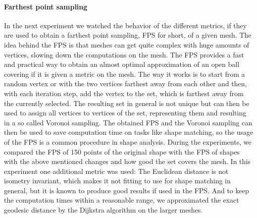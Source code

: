 \paragraph{Farthest point sampling}
In the next experiment we watched the behavior of the different metrics, if they are used to obtain a farthest point sampling, FPS for short, of a given mesh.
The idea behind the FPS is that meshes can get quite complex with huge amounts of vertices, slowing down the computations on the mesh.
The FPS provides a fast and practical way to obtain an almost optimal approximation of an open ball covering if it is given a metric on the mesh.
The way it works is to start from a random vertex or with the two vertices farthest away from each other and then, with each iteration step, add the vertex to the set, which is farthest away from the currently selected.
The resulting set in general is not unique but can then be used to assign all vertices to vertices of the set, representing them and resulting in a so called Voronoi sampling.
The obtained FPS and the Voronoi sampling can then be used to save computation time on tasks like shape matching, so the usage of the FPS is a common procedure in shape analysis.
During the experiments, we compared the FPS of 150 points  of the original shape with the FPS of shapes with the above mentioned changes and how good the set covers the mesh.
In this experiment one additional metric was used:
The Euclidean distance is not isometry invariant, which makes it not fitting to use for shape matching in general, but it is known to produce good results if used in the FPS.
And to keep the computation times within a reasonable range, we approximated the exact geodesic distance by the Dijkstra algorithm on the larger meshes.

